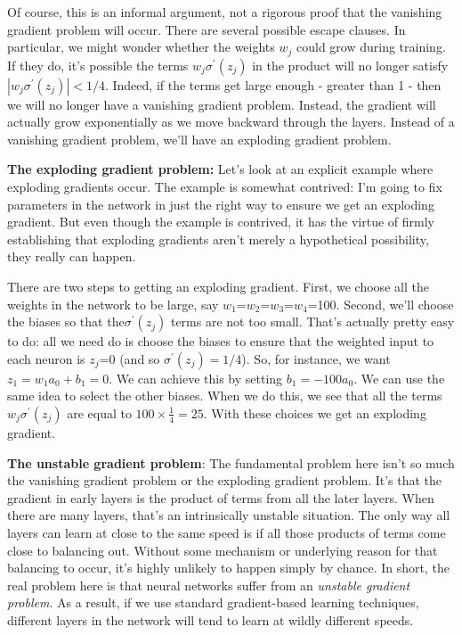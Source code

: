 Of course, this is an informal argument, not a rigorous proof that the vanishing gradient problem will occur. There are several possible escape clauses. In particular, we might wonder whether the weights $w_j$ could grow during training. If they do, it's possible the terms $w_{j} \sigma^{\prime}\left(z_{j}\right)$ in the product will no longer satisfy $\left|w_{j} \sigma^{\prime}\left(z_{j}\right)\right|<1 / 4$. Indeed, if the terms get large enough - greater than 1 - then we will no longer have a vanishing gradient problem. Instead, the gradient will actually grow exponentially as we move backward through the layers. Instead of a vanishing gradient problem, we'll have an exploding gradient problem.

\textbf{The exploding gradient problem:} Let's look at an explicit example where exploding gradients occur. The example is somewhat contrived: I'm going to fix parameters in the network in just the right way to ensure we get an exploding gradient. But even though the example is contrived, it has the virtue of firmly establishing that exploding gradients aren't merely a hypothetical possibility, they really can happen.

There are two steps to getting an exploding gradient. First, we choose all the weights in the network to be large, say $w_1$=$w_2$=$w_3$=$w_4$=100. Second, we'll choose the biases so that the$\sigma^{\prime}\left(z_{j}\right)$ terms are not too small. That's actually pretty easy to do: all we need do is choose the biases to ensure that the weighted input to each neuron is $z_j$=0 (and so $\sigma^{\prime}\left(z_{j}\right)=1 / 4$). So, for instance, we want $z_{1}=w_{1} a_{0}+b_{1}=0$. We can achieve this by setting $b_{1}=-100  a_{0}$. We can use the same idea to select the other biases. When we do this, we see that all the terms $w_{j} \sigma^{\prime}\left(z_{j}\right)$ are equal to $100 \times\frac{1}{4}=25$. With these choices we get an exploding gradient.

\textbf{The unstable gradient problem}: The fundamental problem here isn't so much the vanishing gradient problem or the exploding gradient problem. It's that the gradient in early layers is the product of terms from all the later layers. When there are many layers, that's an intrinsically unstable situation. The only way all layers can learn at close to the same speed is if all those products of terms come close to balancing out. Without some mechanism or underlying reason for that balancing to occur, it's highly unlikely to happen simply by chance. In short, the real problem here is that neural networks suffer from an \textit{unstable gradient problem}. As a result, if we use standard gradient-based learning techniques, different layers in the network will tend to learn at wildly different speeds.




